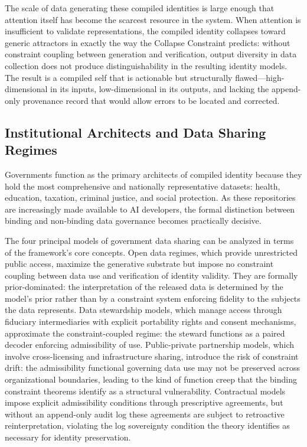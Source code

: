 \documentclass[12pt, a4paper]{article}
\theoremstyle{plain}
\theoremstyle{definition}
\theoremstyle{remark}
\begin{document}
The scale of data generating these compiled identities is large enough that attention itself has become the scarcest resource in the system. When attention is insufficient to validate representations, the compiled identity collapses toward generic attractors in exactly the way the Collapse Constraint predicts: without constraint coupling between generation and verification, output diversity in data collection does not produce distinguishability in the resulting identity models. The result is a compiled self that is actionable but structurally flawed---high-dimensional in its inputs, low-dimensional in its outputs, and lacking the append-only provenance record that would allow errors to be located and corrected.

\subsection{Institutional Architects and Data Sharing Regimes}

Governments function as the primary architects of compiled identity because they hold the most comprehensive and nationally representative datasets: health, education, taxation, criminal justice, and social protection. As these repositories are increasingly made available to AI developers, the formal distinction between binding and non-binding data governance becomes practically decisive.

The four principal models of government data sharing can be analyzed in terms of the framework's core concepts. Open data regimes, which provide unrestricted public access, maximize the generative substrate but impose no constraint coupling between data use and verification of identity validity. They are formally prior-dominated: the interpretation of the released data is determined by the model's prior rather than by a constraint system enforcing fidelity to the subjects the data represents. Data stewardship models, which manage access through fiduciary intermediaries with explicit portability rights and consent mechanisms, approximate the constraint-coupled regime: the steward functions as a paired decoder enforcing admissibility of use. Public-private partnership models, which involve cross-licensing and infrastructure sharing, introduce the risk of constraint drift: the admissibility functional governing data use may not be preserved across organizational boundaries, leading to the kind of function creep that the binding constraint theorems identify as a structural vulnerability. Contractual models impose explicit admissibility conditions through prescriptive agreements, but without an append-only audit log these agreements are subject to retroactive reinterpretation, violating the log sovereignty condition the theory identifies as necessary for identity preservation.
\end{document}
